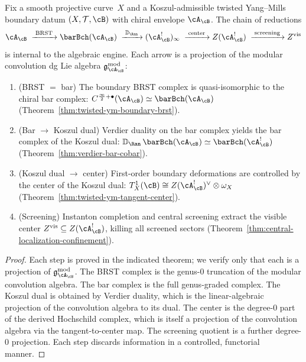 \begin{theorem}
\label{thm:ym-bar-bridge}
Fix a smooth projective curve~$X$ and a Koszul-admissible twisted
Yang--Mills boundary datum $(X,\mathcal{T},\cB)$ with chiral
envelope $\cA_{\cB}$. The chain of reductions
\[
\cA_{\cB}
\;\xrightarrow{\;\text{BRST}\;}
\barBch(\cA_{\cB})
\;\xrightarrow{\;\mathbb{D}_{\Ran}\;}
(\cA_{\cB}^!)_\infty
\;\xrightarrow{\;\text{center}\;}
Z(\cA_{\cB}^!)
\;\xrightarrow{\;\text{screening}\;}
Z^{\mathrm{vis}}
\]
is internal to the algebraic engine. Each arrow is a projection of
the modular convolution dg Lie algebra
$\mathfrak{g}^{\mathrm{mod}}_{\cA_{\cB}}$:
\begin{enumerate}[label=\textup{(\roman*)}]
\item \textup{(BRST $=$ bar)}\quad
 The boundary BRST complex is quasi-isomorphic to the chiral bar
 complex:
 $C^{\frac{\infty}{2}+\bullet}(\cA_{\cB}) \simeq
 \barBch(\cA_{\cB})$
 \textup{(}Theorem~\textup{\ref{thm:twisted-ym-boundary-brst}}\textup{)}.
\item \textup{(Bar $\to$ Koszul dual)}\quad
 Verdier duality on the bar complex yields the bar complex of
 the Koszul dual:
 $\mathbb{D}_{\Ran}\,\barBch(\cA_{\cB}) \simeq
 \barBch(\cA_{\cB}^!)$
 \textup{(}Theorem~\textup{\ref{thm:verdier-bar-cobar}}\textup{)}.
\item \textup{(Koszul dual $\to$ center)}\quad
 First-order boundary deformations are controlled by the center
 of the Koszul dual: $T^1_X(\cB) \cong Z(\cA_{\cB}^!)^\vee
 \otimes \omega_X$
 \textup{(}Theorem~\textup{\ref{thm:twisted-ym-tangent-center}}\textup{)}.
\item \textup{(Screening)}\quad
 Instanton completion and central screening extract the visible
 center $Z^{\mathrm{vis}} \subseteq Z(\cA_{\cB}^!)$, killing all
 screened sectors
 \textup{(}Theorem~\textup{\ref{thm:central-localization-confinement}}\textup{)}.
\end{enumerate}
\end{theorem}

\begin{proof}
Each step is proved in the indicated theorem; we verify only that
each is a projection of $\mathfrak{g}^{\mathrm{mod}}_{\cA_{\cB}}$.
The BRST complex is the genus-$0$ truncation of the modular
convolution algebra. The bar complex is the full genus-graded
complex. The Koszul dual is obtained by Verdier duality, which is
the linear-algebraic projection of the convolution algebra to its
dual. The center is the degree-$0$ part of the derived Hochschild
complex, which is itself a projection of the convolution algebra
via the tangent-to-center map. The screening quotient is a further
degree-$0$ projection. Each step discards information in a
controlled, functorial manner.
\end{proof}

